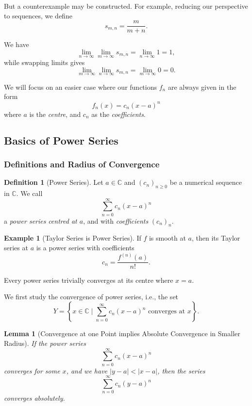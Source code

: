 \documentclass[11pt]{article}
\numberwithin{equation}{section}
\newtheorem{lemma}[theorem]{Lemma}
\theoremstyle{definition}
\newtheorem{definition}[theorem]{Definition}
\newtheorem{example}[theorem]{Example}
\theoremstyle{remark}
\newcommand{\pqty}[1]{\left(#1\right)}
\newcommand{\abs}[1]{\left|#1\right|}
\newcommand{\set}[2]{\left\{#1\mid #2\right\}}
\newcommand{\CC}{\mathbb C}
\begin{document}
But a counterexample may be constructed. For example, reducing our perspective to sequences, we define
\[
    s_{m, n} = \frac{m}{m + n}.
\]

We have
\[
    \lim_{n \to \infty} \lim_{m \to \infty} s_{m, n} = \lim_{n \to \infty} 1 = 1,
\]
while swapping limits gives
\[
    \lim_{m \to \infty} \lim_{n \to \infty} s_{m, n} = \lim_{m \to \infty} 0 = 0.
\]

We will focus on an easier case where our functions \(f_n\) are always given in the form
\[
    f_n \pqty{x} = c_n \pqty{x - a}^n
\]
where \(a\) is the \emph{centre}, and \(c_n\) as the \emph{coefficients}.

\subsection{Basics of Power Series}

\subsubsection{Definitions and Radius of Convergence}

\begin{definition}[Power Series]\label{analysis-unit-0201}
    \label{def:power-series}%
    Let \(a \in \CC\) and \(\pqty{c_n}_{n\ge0}\) be a numerical sequence in \(\CC\). We call
    \[
        \sum_{n = 0}^{\infty} c_n \pqty{x - a}^n
    \]
    a \emph{power series} \emph{centred at \(a\)}, and with \emph{coefficients} \(\pqty{c_n}_n\).
\end{definition}

\begin{example}[Taylor Series is Power Series]\label{analysis-unit-0202}
    \label{ex:taylor-series}%
    If \(f\) is smooth at \(a\), then its Taylor series at \(a\) is a power series with coefficients
    \[
        c_n = \frac{f^{\pqty{n}} \pqty{a}}{n!}.
    \]
\end{example}

Every power series trivially converges at its centre where \(x = a\).

We first study the convergence of power series, i.e., the set
\[
    Y = \set{x \in \CC}{\sum_{n = 0}^{\infty} c_n \pqty{x - a}^{n} \text{ converges at }x}.
\]

\begin{lemma}[Convergence at one Point implies Absolute Convergence in Smaller Radius]\label{analysis-unit-0203}
    \label{lem:convergence-one-point-implies-convergence-smaller-radius}%
    If the power series
    \[
        \sum_{n = 0}^{\infty} c_n \pqty{x - a}^{n}
    \]
    converges for some \(x\), and we have \(\abs{y - a} < \abs{x - a}\), then the series
    \[
        \sum_{n = 0}^{\infty} c_n \pqty{y - a}^{n}
    \]
    converges absolutely.
\end{lemma}
\end{document}

